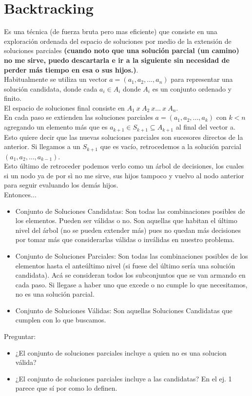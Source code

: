 \documentclass[10pt,a4paper]{article}
\begin{document}
\section*{Backtracking}
Es una técnica (de fuerza bruta pero mas eficiente) que consiste en una exploración ordenada del espacio de soluciones por medio de la extensión de soluciones parciales \textbf{(cuando noto que una solución parcial (un camino) no me sirve, puedo descartarla e ir a la siguiente sin necesidad de perder más tiempo en esa o sus hijos.)}. \\

Habitualmente se utiliza un vector $ a = (a_{1}, a_{2}, ..., a_{n})$ para representar una solución candidata, donde cada $a_{i} \in A_{i}$ donde $A_{i}$ es un conjunto ordenado y finito.  \\

El espacio de soluciones final consiste en $ A_{1} \ x \ A_{2} \ x \dots \ x \ A_{n} $. \\

En cada paso se extienden las soluciones parciales $a = (a_{1}, a_{2}, ..., a_{k})$ con $k<n$ agregando un elemento más que es $a_{k+1} \in S_{k+1} \subseteq A_{k+1}$ al final del vector a. Esto quiere decir que las nuevas soluciones parciales son sucesores directos de la anterior. Si llegamos a un $S_{k+1}$ que es vacío, retrocedemos a la solución parcial $(a_{1}, a_{2}, ..., a_{k-1})$. \\

Esto último de retroceder podemos verlo como un árbol de decisiones, los cuales si un nodo ya de por sì no me sirve, sus hijos tampoco y vuelvo al nodo anterior para seguir evaluando los demás hijos. \\
\newpage
Entonces...
\begin{itemize}
    \item Conjunto de Soluciones Candidatas: Son todas las combinaciones posibles de los elementos. Pueden ser válidas o no. Son aquellas que habitan el último nivel del árbol (no se pueden extender más) pues no quedan más decisiones por tomar más que considerarlas válidas o inválidas en nuestro problema.
    \item Conjunto de Soluciones Parciales: Son todas las combinaciones posibles de los elementos hasta el anteúltimo nivel (si fuese del último sería una solución candidata). Acá se consideran todos los subconjuntos que se van armando en cada paso. Si llegase a haber uno que excede o no cumple lo que necesitamos, no es una solución parcial.
    \item Conjunto de Soluciones Válidas: Son aquellas Soluciones Candidatas que cumplen con lo que buscamos.
\end{itemize}
Preguntar: 
\begin{itemize}
    \item ¿El conjunto de soluciones parciales incluye a quien no es una solucion válida? 
    \item ¿El conjunto de soluciones parciales incluye a las candidatas? En el ej. 1 parece que sí por como lo definen.
\end{itemize}
\end{document}

